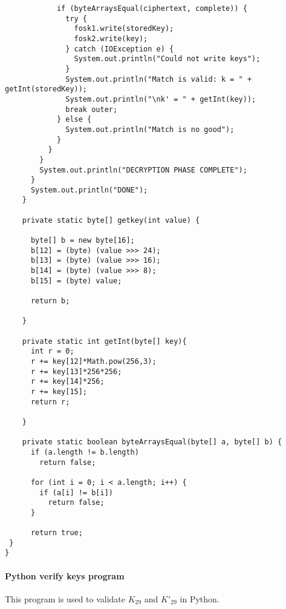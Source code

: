 \documentclass[11pt]{article}
\begin{document}
\begin{verbatim}
	        if (byteArraysEqual(ciphertext, complete)) {
	          try {
	            fosk1.write(storedKey);
	            fosk2.write(key);
	          } catch (IOException e) {
	            System.out.println("Could not write keys");
	          }
	          System.out.println("Match is valid: k = " + getInt(storedKey));
	          System.out.println("\nk' = " + getInt(key));
	          break outer;
	        } else {
	          System.out.println("Match is no good");
	        }
	      }
	    }
	    System.out.println("DECRYPTION PHASE COMPLETE");
	  }
	  System.out.println("DONE");
	}

	private static byte[] getkey(int value) {

	  byte[] b = new byte[16];
	  b[12] = (byte) (value >>> 24);
	  b[13] = (byte) (value >>> 16);
	  b[14] = (byte) (value >>> 8);
	  b[15] = (byte) value;

	  return b;

	}
	
	private static int getInt(byte[] key){
	  int r = 0;
	  r += key[12]*Math.pow(256,3);
	  r += key[13]*256*256;
	  r += key[14]*256;
	  r += key[15];
	  return r;
		
	}

	private static boolean byteArraysEqual(byte[] a, byte[] b) {
	  if (a.length != b.length)
	    return false;

	  for (int i = 0; i < a.length; i++) {
	    if (a[i] != b[i])
	      return false;
	  }

	  return true;
 }
}

\end{verbatim}

\paragraph{Python verify keys program}
\begin{flushleft}
This program is used to validate $K_{29}$ and $K'_{29}$ in Python.
\end{flushleft}
\end{document}
